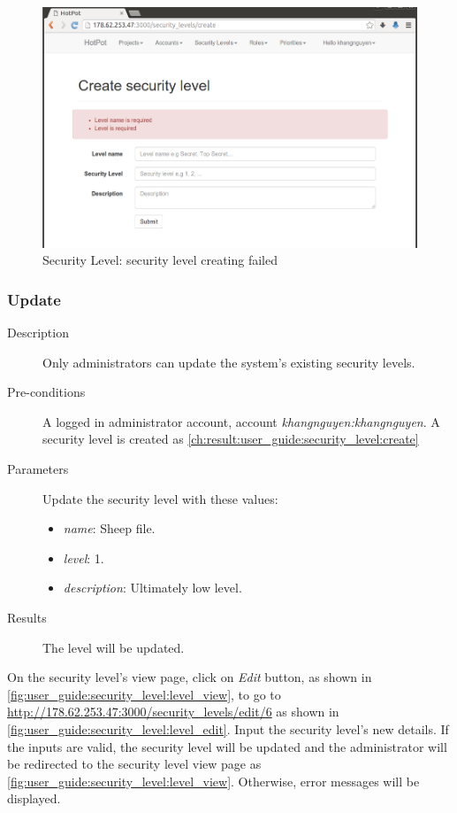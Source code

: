\begin{figure}[bth]
\myfloatalign
\includegraphics[width=1.0\linewidth]{gfx/chapter_5/security_level/level_create_failed}
\caption[Security Level: security level create]{Security Level: security level creating failed}
\label{fig:user_guide:security_level:level_create_failed}
\end{figure}

\clearpage

\subsubsection{Update}
\label{ch:result:user_guide:security_level:update}

\begin{description}
\item[Description] Only administrators can update the system's existing security levels.
\item[Pre-conditions] A logged in administrator account, \eg account \emph{khangnguyen:khangnguyen}.
A security level is created as \autoref{ch:result:user_guide:security_level:create}
\item[Parameters] Update the security level with these values:
\begin{itemize}
\item \emph{name}: Sheep file.
\item \emph{level}: 1.
\item \emph{description}: Ultimately low level.
\end{itemize}
\item[Results] The level will be updated.
\end{description}

On the security level's view page, click on \emph{Edit} button, as shown in \autoref{fig:user_guide:security_level:level_view}, 
to go to \href{http://178.62.253.47:3000/security\_levels/edit/6}{http://178.62.253.47:3000/security\_levels/edit/6} as shown in \autoref{fig:user_guide:security_level:level_edit}.
Input the security level's new details.
If the inputs are valid, the security level will be updated and the administrator will be redirected to the security level view page as \autoref{fig:user_guide:security_level:level_view}.
Otherwise, error messages will be displayed.

